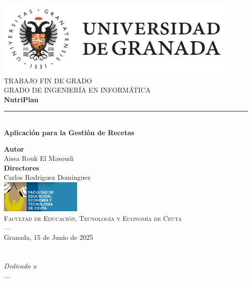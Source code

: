 \documentclass[twoside, openright, 11pt]{report}
\begin{document}
\begin{titlepage}
\newlength{\centeroffset}
\setlength{\centeroffset}{-0.5\oddsidemargin}
\addtolength{\centeroffset}{0.5\evensidemargin}
\thispagestyle{empty}
\noindent\hspace*{\centeroffset}\begin{minipage}{\textwidth}
\centering
\includegraphics[width=0.9\textwidth]{imagenes/logo_ugr}\\[1.4cm]
\textsc{ \Large TRABAJO FIN DE GRADO\\[0.2cm]}
\textsc{ GRADO DE INGENIERÍA EN INFORMÁTICA}\\[1cm]
{\huge\bfseries NutriPlan\\}
\noindent\rule[-1ex]{\textwidth}{3pt}\\[3.5ex]
{\large\bfseries Aplicación para la Gestión de Recetas}
\end{minipage}

\vspace{0.5cm}
\noindent\hspace*{\centeroffset}\begin{minipage}{\textwidth}
\centering
\textbf{Autor}\\ Aissa Rouk El Masoudi\\[2.5ex]
\textbf{Directores}\\
Carlos Rodriguez Dominguez\\[2cm]
\includegraphics[width=0.3\textwidth]{imagenes/logo-ceuta.jpg}\\[0.1cm]
\textsc{Facultad de Educación, Tecnología y Economía de Ceuta}\\
\textsc{---}\\
Granada, 15 de Junio de 2025
\end{minipage}
\end{titlepage}
\let\cleardoublepage\clearpage

\chapter*{}
\begin{flushright}
\textit{Dedicado a\\
...}
\end{flushright}
\thispagestyle{empty}
\end{document}
